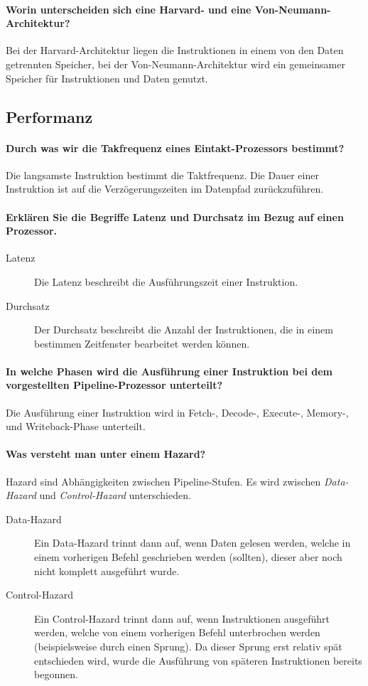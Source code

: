 		\paragraph{Worin unterscheiden sich eine Harvard- und eine Von-Neumann-Architektur?}
			Bei der Harvard-Architektur liegen die Instruktionen in einem von den Daten getrennten Speicher, bei der Von-Neumann-Architektur wird ein gemeinsamer Speicher für Instruktionen und Daten genutzt.

		\subsection{Performanz}
			\paragraph{Durch was wir die Takfrequenz eines Eintakt-Prozessors bestimmt?}
				Die langsamste Instruktion bestimmt die Taktfrequenz. Die Dauer einer Instruktion ist auf die Verzögerungszeiten im Datenpfad zurückzuführen.

			\paragraph{Erklären Sie die Begriffe Latenz und Durchsatz im Bezug auf einen Prozessor.}
				\begin{description}
					\item[Latenz] Die Latenz beschreibt die Ausführungszeit einer Instruktion.
					\item[Durchsatz] Der Durchsatz beschreibt die Anzahl der Instruktionen, die in einem bestimmen Zeitfenster bearbeitet werden können.
				\end{description}

			\paragraph{In welche Phasen wird die Ausführung einer Instruktion bei dem vorgestellten Pipeline-Prozessor unterteilt?}
				Die Ausführung einer Instruktion wird in Fetch-, Decode-, Execute-, Memory-, und Writeback-Phase unterteilt.

			\paragraph{Was versteht man unter einem Hazard?}
				Hazard sind Abhängigkeiten zwischen Pipeline-Stufen. Es wird zwischen \textit{Data-Hazard} und \textit{Control-Hazard} unterschieden.
				\begin{description}
					\item[Data-Hazard] Ein Data-Hazard trinnt dann auf, wenn Daten gelesen werden, welche in einem vorherigen Befehl geschrieben werden (sollten), dieser aber noch nicht komplett ausgeführt wurde.
					\item[Control-Hazard] Ein Control-Hazard trinnt dann auf, wenn Instruktionen ausgeführt werden, welche von einem vorherigen Befehl unterbrochen werden (beispielsweise durch einen Sprung). Da dieser Sprung erst relativ spät entschieden wird, wurde die Ausführung von späteren Instruktionen bereits begonnen.
				\end{description}

